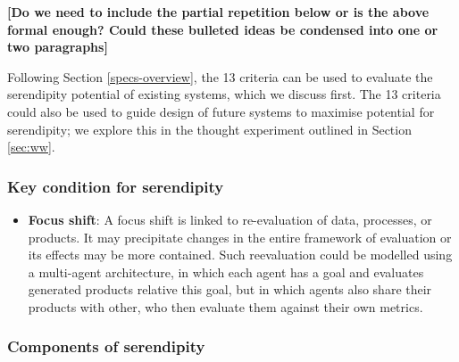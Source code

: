 
\textbf{[Do we need to include the partial repetition below or is the
    above formal enough?  Could these bulleted ideas be condensed into
    one or two paragraphs]}
    
Following Section \ref{specs-overview}, the 13 criteria can be used to evaluate the serendipity potential of existing systems, which we discuss first. The 13 criteria could also be used to guide design of future systems to maximise potential for serendipity; we explore this in the thought experiment outlined in Section \ref{sec:ww}.

\subsubsection*{Key condition for serendipity}

\begin{itemize}
\item \textbf{Focus shift}: A focus shift is linked to re-evaluation
  of data, processes, or products.  It may precipitate changes in the
  entire framework of evaluation or its effects may be more contained.
  Such reevaluation could be modelled using a multi-agent
  architecture, in which each agent has a goal and evaluates generated
  products relative this goal, but in which agents also share their
  products with other, who then evaluate them against their own
  metrics.
\end{itemize}

\subsubsection*{Components of serendipity}

